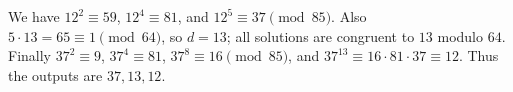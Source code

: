 We have $12^2\equiv 59$, $12^4\equiv 81$, and $12^5\equiv 37\pmod{85}$. Also $5\cdot 13=65\equiv 1\pmod{64}$, so $d=13$; all solutions are congruent to $13$ modulo $64$. Finally $37^2\equiv 9$, $37^4\equiv 81$, $37^8\equiv 16\pmod{85}$, and $37^{13}\equiv 16\cdot 81\cdot 37\equiv 12$. Thus the outputs are $\boxed{37,13,12}$.
